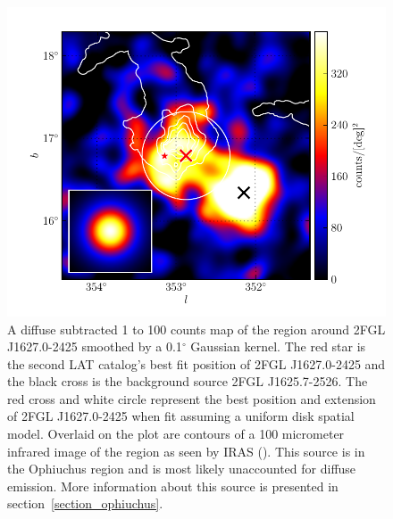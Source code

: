 \documentclass[12pt,preprint]{aastex}
\newcommand{\gev}{\text{GeV}\xspace}
\renewcommand{\deg}{\ensuremath{^\circ}\xspace}
\begin{document}
\begin{figure}
  \begin{center}
    \includegraphics[type=pdf,ext=.pdf,read=.pdf]{source_plots/source_1FGL_J1628.6-2419c}
  \end{center}
  \caption{
  A diffuse subtracted 1 \gev to 100 \gev counts map of the region around
  2FGL J1627.0-2425 smoothed by a 0.1\deg Gaussian kernel.  The red star
  is the second LAT catalog's best fit position of 2FGL J1627.0-2425 and
  the black cross is the background source 2FGL J1625.7-2526.  The red
  cross and white circle represent the best position and extension of
  2FGL J1627.0-2425 when fit assuming a uniform disk spatial model.
  Overlaid on the plot are contours of a 100 micrometer infrared
  image of the region as seen by IRAS (\cite{iras_rho_ophiuci}). This
  source is in the Ophiuchus region and is most likely unaccounted for
  diffuse emission.  More information about this source is presented
  in section~\ref{section_ophiuchus}.
  }\label{1FGL_J1628.6-2419c}
\end{figure}
\end{document}
